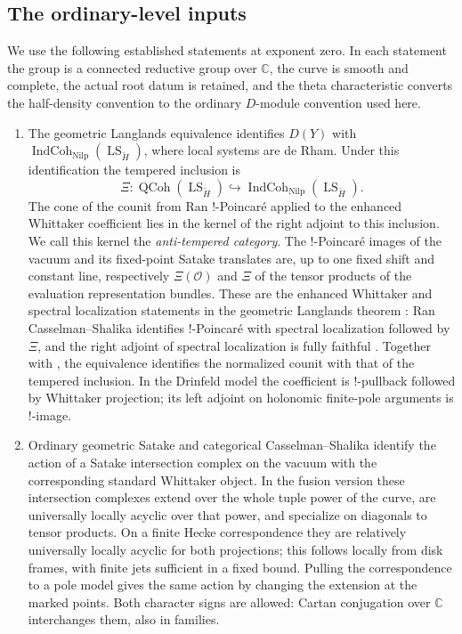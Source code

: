 \documentclass[11pt]{article}
\numberwithin{equation}{section}
\theoremstyle{definition}
\theoremstyle{remark}
\begin{document}
\subsection{The ordinary-level inputs}\label{deform:classical-inputs}

We use the following established statements at exponent zero.  In each
statement the group is a connected reductive group over $\mathbb C$, the
curve is smooth and complete, the actual root datum is retained, and
the theta characteristic converts the half-density convention to the
ordinary $D$-module convention used here.

\begin{enumerate}
\item The geometric Langlands equivalence identifies $D(Y)$ with
$\operatorname{IndCoh}_{\operatorname{Nilp}}
(\operatorname{LS}_{\check H})$, where local systems are de Rham.
Under this identification the tempered inclusion is
\[
 \Xi:\operatorname{QCoh}(\operatorname{LS}_{\check H})
       \hookrightarrow
       \operatorname{IndCoh}_{\operatorname{Nilp}}
                         (\operatorname{LS}_{\check H}).
\]
The cone of the counit from Ran $!$-Poincar\'e applied to the enhanced
Whittaker coefficient lies in the kernel of the right adjoint to this
inclusion.  We call this kernel the \emph{anti-tempered category}.
The $!$-Poincar\'e images of the vacuum and its fixed-point Satake
translates are, up to one fixed shift and constant line, respectively
$\Xi(\mathcal O)$ and $\Xi$ of the tensor products of the evaluation
representation bundles.  These are the enhanced Whittaker and spectral
localization statements in the geometric Langlands theorem
\cite{GLCI,GLCII,GLCIII,GLCIV,GLCV}: Ran Casselman--Shalika identifies
$!$-Poincar\'e with spectral localization followed by $\Xi$, and the
right adjoint of spectral localization is fully faithful
\cite[Section~18.1.1, Proposition~18.1.6 and Equation~(18.4)]{GLCII}.
Together with \cite[Section~5.1 and Equation~(5.1)]{GLCI}, the
equivalence identifies the normalized counit with that of the
tempered inclusion.  In the
Drinfeld model the coefficient is $!$-pullback followed by Whittaker
projection; its left adjoint on holonomic finite-pole arguments is
$!$-image.

\item Ordinary geometric Satake and categorical Casselman--Shalika
identify the action of a Satake intersection complex on the vacuum
with the corresponding standard Whittaker object.  In the fusion
version these intersection complexes extend over the whole tuple
power of the curve, are universally locally acyclic over that power,
and specialize on diagonals to tensor products.  On a finite Hecke
correspondence they are relatively universally locally acyclic for
both projections; this follows locally from disk frames, with finite
jets sufficient in a fixed bound.  Pulling the correspondence to a
pole model gives the same action by changing the extension at the
marked points.  Both character signs are allowed: Cartan conjugation
over $\mathbb C$ interchanges them, also in families.


\end{enumerate}
\end{document}
